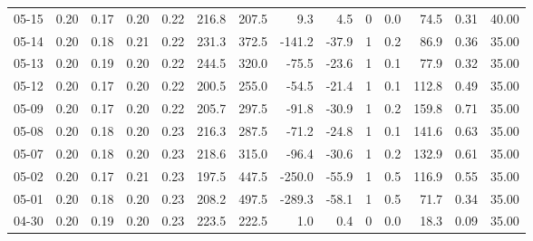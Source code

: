 \begin{threeparttable}
{\begin{tabular}{lrrrrrrrrrrrrr}
  05-15 &          0.20 &          0.17 &          0.20 &        0.22 &               216.8 &               207.5 &        9.3 &          4.5 &              0 &                 0.0 &             74.5 &            0.31 &                  40.00 \\
  05-14 &          0.20 &          0.18 &          0.21 &        0.22 &               231.3 &               372.5 &     -141.2 &        -37.9 &              1 &                 0.2 &             86.9 &            0.36 &                  35.00 \\
  05-13 &          0.20 &          0.19 &          0.20 &        0.22 &               244.5 &               320.0 &      -75.5 &        -23.6 &              1 &                 0.1 &             77.9 &            0.32 &                  35.00 \\
  05-12 &          0.20 &          0.17 &          0.20 &        0.22 &               200.5 &               255.0 &      -54.5 &        -21.4 &              1 &                 0.1 &            112.8 &            0.49 &                  35.00 \\
  05-09 &          0.20 &          0.17 &          0.20 &        0.22 &               205.7 &               297.5 &      -91.8 &        -30.9 &              1 &                 0.2 &            159.8 &            0.71 &                  35.00 \\
  05-08 &          0.20 &          0.18 &          0.20 &        0.23 &               216.3 &               287.5 &      -71.2 &        -24.8 &              1 &                 0.1 &            141.6 &            0.63 &                  35.00 \\
  05-07 &          0.20 &          0.18 &          0.20 &        0.23 &               218.6 &               315.0 &      -96.4 &        -30.6 &              1 &                 0.2 &            132.9 &            0.61 &                  35.00 \\
  05-02 &          0.20 &          0.17 &          0.21 &        0.23 &               197.5 &               447.5 &     -250.0 &        -55.9 &              1 &                 0.5 &            116.9 &            0.55 &                  35.00 \\
  05-01 &          0.20 &          0.18 &          0.20 &        0.23 &               208.2 &               497.5 &     -289.3 &        -58.1 &              1 &                 0.5 &             71.7 &            0.34 &                  35.00 \\
  04-30 &          0.20 &          0.19 &          0.20 &        0.23 &               223.5 &               222.5 &        1.0 &          0.4 &              0 &                 0.0 &             18.3 &            0.09 &                  35.00 \\

\end{tabular}}
\end{threeparttable}
